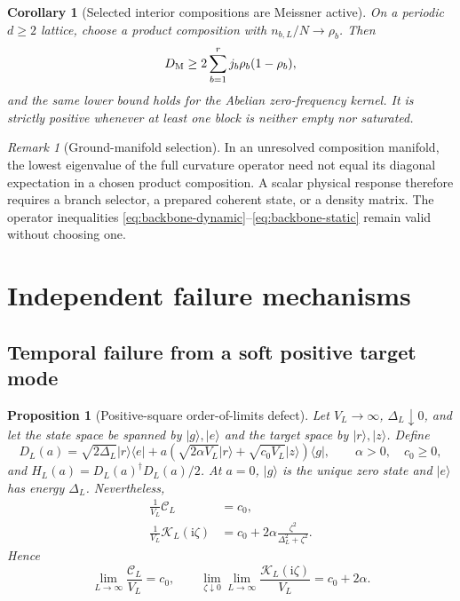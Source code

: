 \documentclass[11pt]{article}
\newtheorem{proposition}[theorem]{Proposition}
\newtheorem{corollary}[theorem]{Corollary}
\theoremstyle{definition}
\theoremstyle{remark}
\newtheorem{remark}[theorem]{Remark}
\newcommand{\cK}{\mathcal K}
\newcommand{\cC}{\mathcal C}
\newcommand{\I}{\mathrm i}
\newcommand{\ket}[1]{\lvert #1\rangle}
\newcommand{\bra}[1]{\langle #1\rvert}
\begin{document}
\begin{corollary}[Selected interior compositions are Meissner active]
\label{cor:selected-composition}
On a periodic $d\ge2$ lattice, choose a product composition with $n_{b,L}/N\to\rho_b$.  Then
\begin{equation}
 D_{\rm M}\ge2\sum_{b=1}^rj_b\rho_b(1-\rho_b),
 \label{eq:multiblock-floor}
\end{equation}
and the same lower bound holds for the Abelian zero-frequency kernel.  It is strictly positive whenever at
least one block is neither empty nor saturated.
\end{corollary}

\begin{remark}[Ground-manifold selection]
In an unresolved composition manifold, the lowest eigenvalue of the full curvature operator need not
equal its diagonal expectation in a chosen product composition.  A scalar physical response therefore
requires a branch selector, a prepared coherent state, or a density matrix.  The operator inequalities
\eqref{eq:backbone-dynamic}--\eqref{eq:backbone-static} remain valid without choosing one.
\end{remark}

\section{Independent failure mechanisms}
\label{sec:counterexamples}

\subsection{Temporal failure from a soft positive target mode}

\begin{proposition}[Positive-square order-of-limits defect]
\label{prop:soft-target-counterexample}
Let $V_L\to\infty$, $\Delta_L\downarrow0$, and let the state space be spanned by
$\ket g,\ket e$ and the target space by $\ket r,\ket z$.  Define
\begin{equation}
 D_L(a)
 =\sqrt{2\Delta_L}\ket r\bra e
 +a\left(\sqrt{2\alpha V_L}\ket r+\sqrt{c_0V_L}\ket z\right)\bra g,
 \qquad
 \alpha>0,
 \quad c_0\ge0,
 \label{eq:soft-target-D}
\end{equation}
and $H_L(a)=D_L(a)^\dagger D_L(a)/2$.  At $a=0$, $\ket g$ is the unique zero state and $\ket e$ has
energy $\Delta_L$.  Nevertheless,
\begin{align}
 \frac1{V_L}\cC_L&=c_0,
 \label{eq:soft-static}\\
 \frac1{V_L}\cK_L(\I\zeta)
 &=c_0+2\alpha\frac{\zeta^2}{\Delta_L^2+\zeta^2}.
 \label{eq:soft-dynamic}
\end{align}
Hence
\begin{equation}
 \lim_{L\to\infty}\frac{\cC_L}{V_L}=c_0,
 \qquad
 \lim_{\zeta\downarrow0}\lim_{L\to\infty}
 \frac{\cK_L(\I\zeta)}{V_L}=c_0+2\alpha.
 \label{eq:soft-noncommute}
\end{equation}
\end{proposition}
\end{document}
